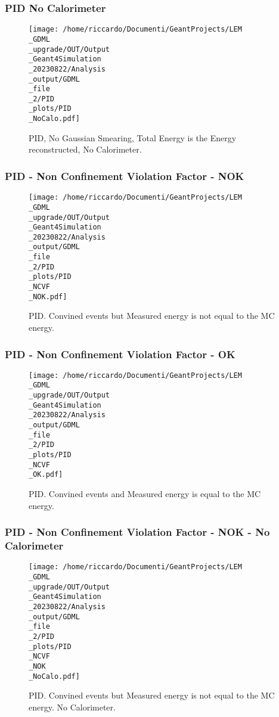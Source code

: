 \documentclass[8pt]{beamer}
\begin{document}
            \begin{frame}
                \frametitle{PID No Calorimeter}
            
        \begin{figure}[h]
            \centering
            \texttt{[image: /home/riccardo/Documenti/GeantProjects/LEM\\\_GDML\\\_upgrade/OUT/Output\\\_Geant4Simulation\\\_20230822/Analysis\\\_output/GDML\\\_file\\\_2/PID\\\_plots/PID\\\_NoCalo.pdf]}
            \caption{PID, No Gaussian Smearing, Total Energy is the Energy reconstructed, No Calorimeter.}
        \end{figure}
        
            \end{frame}
            
            \begin{frame}
                \frametitle{PID - Non Confinement Violation Factor - NOK}
            
        \begin{figure}[h]
            \centering
            \texttt{[image: /home/riccardo/Documenti/GeantProjects/LEM\\\_GDML\\\_upgrade/OUT/Output\\\_Geant4Simulation\\\_20230822/Analysis\\\_output/GDML\\\_file\\\_2/PID\\\_plots/PID\\\_NCVF\\\_NOK.pdf]}
            \caption{PID. Convined events but Measured energy is not equal to the MC energy.}
        \end{figure}
        
            \end{frame}
            
            \begin{frame}
                \frametitle{PID - Non Confinement Violation Factor - OK}
            
        \begin{figure}[h]
            \centering
            \texttt{[image: /home/riccardo/Documenti/GeantProjects/LEM\\\_GDML\\\_upgrade/OUT/Output\\\_Geant4Simulation\\\_20230822/Analysis\\\_output/GDML\\\_file\\\_2/PID\\\_plots/PID\\\_NCVF\\\_OK.pdf]}
            \caption{PID. Convined events and Measured energy is equal to the MC energy.}
        \end{figure}
        
            \end{frame}
            
            \begin{frame}
                \frametitle{PID - Non Confinement Violation Factor - NOK - No Calorimeter}
            
        \begin{figure}[h]
            \centering
            \texttt{[image: /home/riccardo/Documenti/GeantProjects/LEM\\\_GDML\\\_upgrade/OUT/Output\\\_Geant4Simulation\\\_20230822/Analysis\\\_output/GDML\\\_file\\\_2/PID\\\_plots/PID\\\_NCVF\\\_NOK\\\_NoCalo.pdf]}
            \caption{PID. Convined events but Measured energy is not equal to the MC energy. No Calorimeter.}
        \end{figure}
        
            \end{frame}
            
\end{document}
